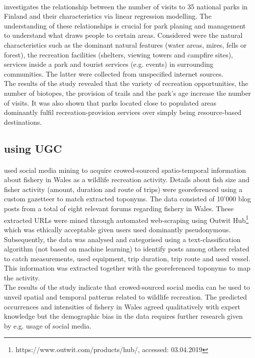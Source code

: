 \paragraph*{\textcite{Neuvonen2010}} investigates the relationship between the number of visits to 35 national parks in Finland and their characteristics via linear regression modelling. The understanding of these relationships is crucial for park planing and management to understand what draws people to certain areas. Considered were the natural characteristics such as the dominant natural features (water areas, mires, fells or forest), the recreation facilities (shelters, viewing towers and campfire sites), services inside a park and tourist services (e.g. events) in surrounding communities. The latter were collected from unspecified internet sources.\\
The results of the study revealed that the variety of recreation opportunities, the number of biotopes, the provision of trails and the park's age increase the number of visits. It was also shown that parks located close to populated areas dominantly fulfil recreation-provision services over simply being resource-based destinations.

\subsection{using UGC} 

\paragraph*{\textcite{Monkman2018}} used social media mining to acquire crowed-sourced spatio-temporal information about fishery in Wales as a wildlife recreation activity. Details about fish size and fisher activity (amount, duration and route of trips) were georeferenced using a custom gazetteer to match extracted toponyms. The data consisted of 10'000 blog posts from a total of eight relevant forums regarding fishery in Wales. These extracted URLs were mined through automated web-scraping using Outwit Hub\footnote{https://www.outwit.com/products/hub/, accessed: 03.04.2019} which was ethically acceptable given users used dominantly pseudonymous. Subsequently, the data was analysed and categorised using a text-classification algorithm (not based on machine learning) to identify posts among others related to catch measurements, used equipment, trip duration, trip route and used vessel. This information was extracted together with the georeferenced toponyms to map the activity. \\
The results of the study indicate that crowed-sourced social media can be used to unveil spatial and temporal patterns related to wildlife recreation. The predicted occurrences and intensities of fishery in Wales agreed qualitatively with expert knowledge but the demographic bias in the data requires further research given by e.g. usage of social media.

